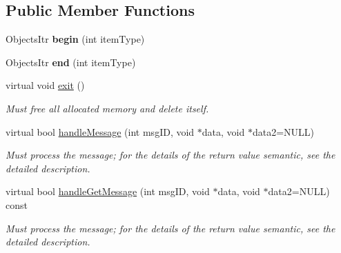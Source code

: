 \subsection*{\-Public \-Member \-Functions}
\begin{DoxyCompactItemize}
\item 
\hypertarget{classComponentInventory_a243675cff307f423e226e89388c10f8f}{
\-Objects\-Itr {\bfseries begin} (int item\-Type)}
\label{d3/d71/classComponentInventory_a243675cff307f423e226e89388c10f8f}

\item 
\hypertarget{classComponentInventory_a33f21c804da5132bc4f6fa13beda8002}{
\-Objects\-Itr {\bfseries end} (int item\-Type)}
\label{d3/d71/classComponentInventory_a33f21c804da5132bc4f6fa13beda8002}

\item 
\hypertarget{classComponentInventory_a01629ce4f437896c25e3cf3b7ebb7a35}{
virtual void \hyperlink{classComponentInventory_a01629ce4f437896c25e3cf3b7ebb7a35}{exit} ()}
\label{d3/d71/classComponentInventory_a01629ce4f437896c25e3cf3b7ebb7a35}

\begin{DoxyCompactList}\small\item\em \-Must free all allocated memory and delete itself. \end{DoxyCompactList}\item 
virtual bool \hyperlink{classComponentInventory_ad9b86329e94b214d9431e333d718c957}{handle\-Message} (int msg\-I\-D, void $\ast$data, void $\ast$data2=\-N\-U\-L\-L)
\begin{DoxyCompactList}\small\item\em \-Must process the message; for the details of the return value semantic, see the detailed description. \end{DoxyCompactList}\item 
virtual bool \hyperlink{classComponentInventory_a34a1b922c3ee15829efb5b5a35f22687}{handle\-Get\-Message} (int msg\-I\-D, void $\ast$data, void $\ast$data2=\-N\-U\-L\-L) const 
\begin{DoxyCompactList}\small\item\em \-Must process the message; for the details of the return value semantic, see the detailed description. \end{DoxyCompactList}\end{DoxyCompactItemize}
